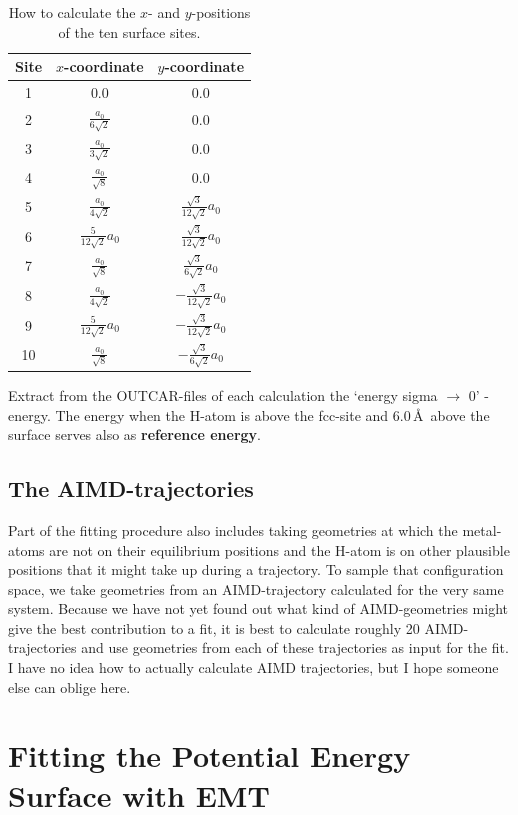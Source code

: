 \documentclass[twoside, 11pt, titlepage, captions=nooneline, a4paper, headsepline]{scrbook}%
\begin{document}
\begin{table}[h!]
\centering
\caption{How to calculate the $x$- and $y$-positions of the ten surface sites.}
\label{calsusi}
\begin{tabular}{ccc}
\hline\hline
Site&$x$-coordinate&$y$-coordinate\\
\hline
1&0.0						&0.0\\
2& $\frac{a_0}{6\sqrt{2}}$	&0.0\\
3& $\frac{a_0}{3\sqrt{2}}$	&0.0\\
4& $\frac{a_0}{\sqrt{8}}$	&0.0\\
5& $\frac{a_0}{4 \sqrt{2}}$	&$\frac{\sqrt{3}}{12\sqrt{2}}a_0$\\
6& $\frac{5}{12\sqrt{2}}a_0$&$\frac{\sqrt{3}}{12\sqrt{2}}a_0$\\
7& $\frac{a_0}{\sqrt{8}}$	&$\frac{\sqrt{3}}{6\sqrt{2}}a_0$\\
8& $\frac{a_0}{4\sqrt{2}}$	&$-\frac{\sqrt{3}}{12\sqrt{2}}a_0$\\
9& $\frac{5}{12\sqrt{2}}a_0$&$-\frac{\sqrt{3}}{12\sqrt{2}}a_0$\\
10&$\frac{a_0}{\sqrt{8}}$ 	&$-\frac{\sqrt{3}}{6\sqrt{2}}a_0$\\
\hline\hline
\end{tabular}
\end{table}\newline\noindent
Extract from the OUTCAR-files of each calculation the `energy sigma $\rightarrow$ 0' -energy. The energy when the H-atom is above the fcc-site and 6.0\,\AA~above the surface serves also as \textbf{reference energy}.
\subsection{The AIMD-trajectories}
Part of the fitting procedure also includes taking geometries at which the metal-atoms are not on their equilibrium positions and the H-atom is on other plausible positions that it might take up during a trajectory. To sample that configuration space, we take geometries from an AIMD-trajectory calculated for the very same system. Because we have not yet found out what kind of AIMD-geometries might give the best contribution to a fit, it is best to calculate roughly 20 AIMD-trajectories and use geometries from each of these trajectories as input for the fit.\\
I have no idea how to actually calculate AIMD trajectories, but I hope someone else can oblige here.

\section{Fitting the Potential Energy Surface with EMT}
\end{document}
